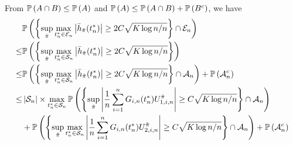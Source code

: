 From $\P\left(A\cap B\right)\leq\P\left(A\right)$ and $\P\left(A\right)\leq\P\left(A\cap B\right)+\P\left(B^{c}\right)$,
we have
\begin{align*}
 & \P\left(\left\{ \sup_{\hat{\pi}}\max_{t_{n}^*\in\En}\left|\hpi(t_{n}^*)\right|\geq2C\sqrt{K\log n/n}\right\} \cap\En\right)\\
\leq & \P\left(\left\{ \sup_{\hat{\pi}}\max_{t_{n}^*\in\Sn}\left|\hpi(t_{n}^*)\right|\geq2C\sqrt{K\log n/n}\right\} \right)\\
\leq & \P\left(\left\{ \sup_{\hat{\pi}}\max_{t_{n}^*\in\Sn}\left|\hpi(t_{n}^*)\right|\geq2C\sqrt{K\log n/n}\right\} \cap\An\right)+\P\left(\An^{c}\right)\\
\leq & \left|\Sn\right|\times\max_{t_{n}^*\in\Sn}\P\left(\left\{ \sup_{\hat{\pi}}\left|\frac{1}{n}\sum_{i=1}^{n}G_{i,n}(t_{n}^*)U_{1,i,n}^{\hat{\pi}}\right|\geq C\sqrt{K\log n/n}\right\} \cap\An\right)\\
 & +\P\left(\left\{ \sup_{\hat{\pi}}\max_{t_{n}^*\in\Sn}\left|\frac{1}{n}\sum_{i=1}^{n}G_{i,n}(t_{n}^*)U_{2,i,n}^{\hat{\pi}}\right|\geq C\sqrt{K\log n/n}\right\} \cap\An\right)+\P\left(\An^{c}\right)
\end{align*}

